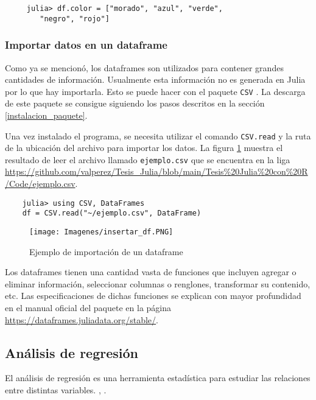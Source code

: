 \begin{verbatim}
     julia> df.color = ["morado", "azul", "verde", 
     	"negro", "rojo"]
\end{verbatim}

\subsubsection{Importar datos en un dataframe}

Como ya se mencionó, los dataframes son utilizados para contener grandes cantidades de información. Usualmente esta información no es generada en \textsf{Julia} por lo que hay importarla. Esto se puede hacer con el paquete \texttt{CSV} \citep{software_csv}. La descarga de este paquete se consigue siguiendo  los pasos descritos en la sección \ref{instalacion_paquete}. 

Una vez instalado el programa, se necesita utilizar el comando \texttt{CSV.read} y la ruta de la ubicación del archivo para importar los datos. La figura \ref{insertar_df} muestra el resultado de leer el archivo llamado \texttt{ejemplo.csv} que se encuentra en la liga \url{https://github.com/valperez/Tesis_Julia/blob/main/Tesis%20Julia%20con%20R/Code/ejemplo.csv}. 

\begin{verbatim}
	julia> using CSV, DataFrames
	df = CSV.read("~/ejemplo.csv", DataFrame)
\end{verbatim}

\begin{figure}[h]
\begin{center}
\texttt{[image: Imagenes/insertar\_df.PNG]}
	\caption{Ejemplo de importación de un dataframe}
  \label{insertar_df}
\end{center}
\end{figure}

Los dataframes tienen una cantidad vasta de funciones que incluyen agregar o eliminar información, seleccionar columnas o renglones, transformar su contenido, etc. Las especificaciones de dichas funciones se explican con mayor profundidad en el manual oficial del paquete en la página \url{https://dataframes.juliadata.org/stable/}. 

\subsection{Análisis de regresión} \label{cap_regresiones}

El análisis de regresión es una herramienta estadística para estudiar las relaciones entre distintas variables. , \cite{regression_other_stories}. 

